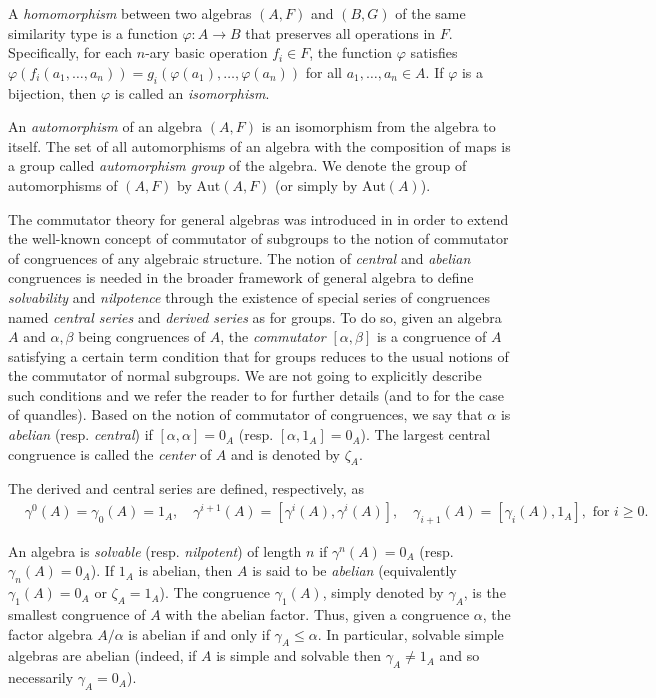 \documentclass[a4paper, english, 9pt]{amsart}
\theoremstyle{plain}
\theoremstyle{definition}
\def\aut#1{\mathrm{Aut}(#1)}
\begin{document}
A \emph{homomorphism} between two algebras $(A, F)$ and $(B, G)$ of the same similarity type is a function $\varphi: A \rightarrow B$ that preserves all operations in $F$. Specifically, for each $n$-ary basic operation $f_i \in F$, the function $\varphi$ satisfies $\varphi(f_i(a_1, \ldots, a_n)) = g_i(\varphi(a_1), \ldots, \varphi(a_n))$ for all $a_1, \ldots, a_n \in A$. If $\varphi$ is a bijection, then $\varphi$ is called an \emph{isomorphism}.



An \emph{automorphism} of an algebra $(A, F)$ is an isomorphism from the algebra to itself. The set of all automorphisms of an algebra with the composition of maps is a group called \emph{automorphism group} of the algebra. We denote the group of automorphisms of $(A,F)$ by $\aut{A,F}$ (or simply by $\aut{A}$).


The commutator theory for general algebras was introduced in \cite{comm} in order to extend the well-known concept of commutator of subgroups to the notion of commutator of congruences of any algebraic structure. The notion of {\it central} and {\it abelian} congruences is needed in the broader framework of general algebra to define {\it solvability} and {\it nilpotence} through the existence of special series of congruences named \emph{central series} and \emph{derived series} as for groups. To do so, given an algebra $A$ and $\alpha,\beta$ being congruences of $A$, the {\it commutator} $[\alpha,\beta]$ is a congruence of $A$ satisfying a certain term condition that for groups reduces to the usual notions of the commutator of normal subgroups. We are not going to explicitly describe such conditions and we refer the reader to \cite{comm} for further details (and to \cite{CP} for the case of quandles). Based on the notion of commutator of congruences, we say that $\alpha$ is {\it abelian} (resp. {\it central}) if $[\alpha,\alpha]=0_A$ (resp. $[\alpha,1_A]=0_A$). The largest central congruence is called the {\it center} of $A$ and is denoted by $\zeta_A$. 

The derived and central series are defined, respectively, as 
\begin{align*}
    &\gamma^0(A)=\gamma_0(A)=1_A,\quad \gamma^{i+1}(A)=[\gamma^i(A),\gamma^i(A)], \quad \gamma_{i+1}(A)=[\gamma_i(A),1_A],\text{ for } i\geq 0.
\end{align*}

An algebra is {\it solvable} (resp. {\it nilpotent}) of length $n$ if $\gamma^n(A)=0_A$ (resp. $\gamma_n(A)=0_A$). If $1_A$ is abelian, then $A$ is said to be {\it abelian} (equivalently $\gamma_1(A)=0_A$ or $\zeta_A=1_A$). The congruence $\gamma_1(A)$, simply denoted by $\gamma_A$, is the smallest congruence of $A$ with the abelian factor. Thus, given a congruence $\alpha$, the factor algebra $A/\alpha$ is abelian if and only if $\gamma_A \leq \alpha$. In particular, solvable simple algebras are abelian (indeed, if $A$ is simple and solvable then $\gamma_A\neq 1_A$ and so necessarily $\gamma_A=0_A$).
\end{document}
